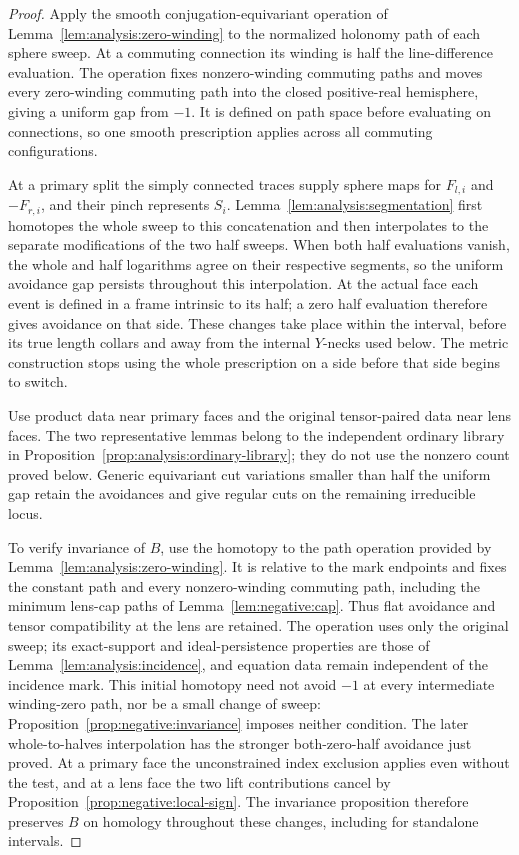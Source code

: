 \begin{proof}
Apply the smooth conjugation-equivariant operation of
Lemma~\ref{lem:analysis:zero-winding} to the normalized holonomy path
of each sphere sweep.  At a commuting connection its winding is half
the line-difference evaluation.  The operation fixes nonzero-winding
commuting paths and moves every zero-winding commuting path into the
closed positive-real hemisphere, giving a uniform gap from \(-1\).
It is defined on path space before evaluating on connections, so one
smooth prescription applies across all commuting configurations.

At a primary split the simply connected traces supply sphere maps for
\(F_{l,i}\) and \(-F_{r,i}\), and their pinch represents \(S_i\).
Lemma~\ref{lem:analysis:segmentation} first homotopes the whole sweep
to this concatenation and then interpolates to the separate modifications
of the two half sweeps.  When both half evaluations vanish, the whole
and half logarithms agree on their respective segments, so the uniform
avoidance gap persists throughout this interpolation.  At the actual
face each event is defined in a frame intrinsic to its half; a zero
half evaluation therefore gives avoidance on that side.  These changes
take place within the interval, before its true length collars and away
from the internal \(Y\)-necks used below.  The metric construction
stops using the whole prescription on a side before that side begins
to switch.

Use product data near primary faces and the original tensor-paired
data near lens faces.  The two representative lemmas belong to the
independent ordinary library in
Proposition~\ref{prop:analysis:ordinary-library}; they do not use the
nonzero count proved below.  Generic equivariant cut variations smaller
than half the uniform gap retain the avoidances and give regular cuts
on the remaining irreducible locus.

To verify invariance of \(B\), use the homotopy to the path operation
provided by Lemma~\ref{lem:analysis:zero-winding}.  It is relative to
the mark endpoints and fixes the constant path and every nonzero-winding
commuting path, including the minimum lens-cap paths of
Lemma~\ref{lem:negative:cap}.  Thus flat avoidance and tensor
compatibility at the lens are retained.  The operation uses only the
original sweep; its exact-support and ideal-persistence properties are
those of Lemma~\ref{lem:analysis:incidence}, and equation data remain
independent of the incidence mark.  This initial homotopy need not avoid
\(-1\) at every intermediate winding-zero path, nor be a small change
of sweep: Proposition~\ref{prop:negative:invariance} imposes neither
condition.  The later whole-to-halves interpolation has the stronger
both-zero-half avoidance just proved.  At a primary face the
unconstrained index exclusion applies even without the test, and at a
lens face the two lift contributions cancel by
Proposition~\ref{prop:negative:local-sign}.  The invariance proposition
therefore preserves \(B\) on homology throughout these changes,
including for standalone intervals.
\end{proof}

